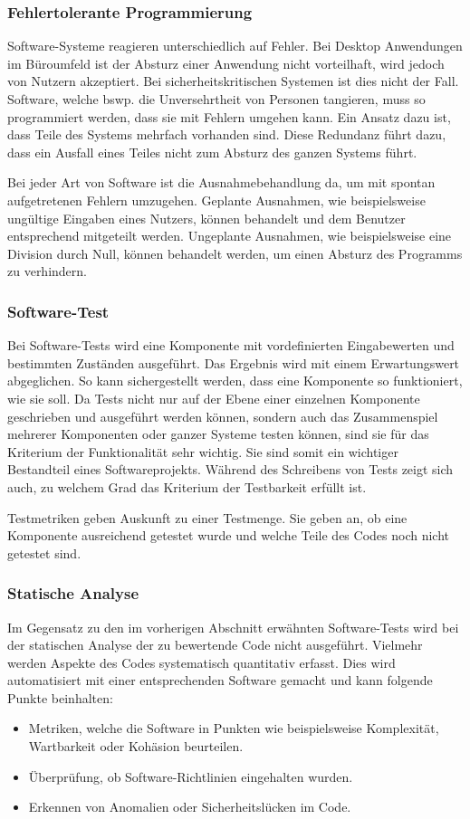 \subsubsection{Fehlertolerante Programmierung}
Software-Systeme reagieren unterschiedlich auf Fehler.
Bei Desktop Anwendungen im Büroumfeld ist der Absturz einer Anwendung nicht vorteilhaft, wird jedoch von Nutzern akzeptiert.
Bei sicherheitskritischen Systemen ist dies nicht der Fall.
Software, welche bswp. die Unversehrtheit von Personen tangieren, muss so programmiert werden, dass sie mit Fehlern umgehen kann.
Ein Ansatz dazu ist, dass Teile des Systems mehrfach vorhanden sind.
Diese Redundanz führt dazu, dass ein Ausfall eines Teiles nicht zum Absturz des ganzen Systems führt.

Bei jeder Art von Software ist die Ausnahmebehandlung da, um mit spontan aufgetretenen Fehlern umzugehen.
Geplante Ausnahmen, wie beispielsweise ungültige Eingaben eines Nutzers, können behandelt und dem Benutzer entsprechend mitgeteilt werden.
Ungeplante Ausnahmen, wie beispielsweise eine Division durch Null, können behandelt werden, um einen Absturz des Programms zu verhindern.


\subsubsection{Software-Test}\label{quality_test}
Bei Software-Tests wird eine Komponente mit vordefinierten Eingabewerten und bestimmten Zuständen ausgeführt.
Das Ergebnis wird mit einem Erwartungswert abgeglichen.
So kann sichergestellt werden, dass eine Komponente so funktioniert, wie sie soll.
Da Tests nicht nur auf der Ebene einer einzelnen Komponente geschrieben und ausgeführt werden können, sondern auch das Zusammenspiel mehrerer Komponenten oder ganzer Systeme testen können,
sind sie für das Kriterium der Funktionalität sehr wichtig.
Sie sind somit ein wichtiger Bestandteil eines Softwareprojekts.
Während des Schreibens von Tests zeigt sich auch, zu welchem Grad das Kriterium der Testbarkeit erfüllt ist.

Testmetriken geben Auskunft zu einer Testmenge.
Sie geben an, ob eine Komponente ausreichend getestet wurde und welche Teile des Codes noch nicht getestet sind.

\subsubsection{Statische Analyse}
Im Gegensatz zu den im vorherigen Abschnitt erwähnten Software-Tests wird bei der statischen Analyse der zu bewertende Code nicht ausgeführt.
Vielmehr werden Aspekte des Codes systematisch quantitativ erfasst.
Dies wird automatisiert mit einer entsprechenden Software gemacht und kann folgende Punkte beinhalten:
\begin{itemize}
   \item Metriken, welche die Software in Punkten wie beispielsweise Komplexität, Wartbarkeit oder Kohäsion beurteilen.
   \item Überprüfung, ob Software-Richtlinien eingehalten wurden.
   \item Erkennen von Anomalien oder Sicherheitslücken im Code.
\end{itemize}

